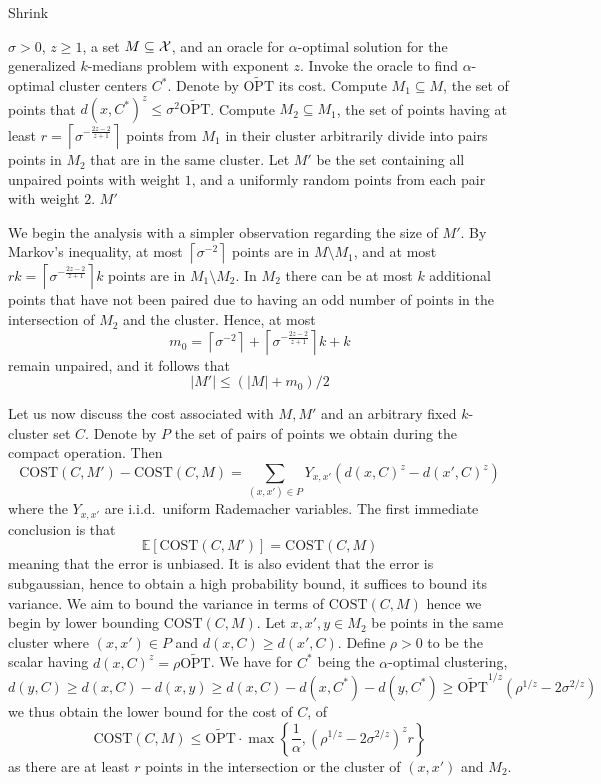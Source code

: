 \documentclass[11pt]{article}
\newcommand{\ceil}[1]{\left \lceil #1 \right \rceil}
\newcommand{\E}{{\mathbb{E}}}
\newcommand{\cost}{\text{COST}}
\newcommand{\topt}{\widetilde{\text{OPT}}}
\begin{document}
\begin{algorithm} 
\begin{algorithmic}
\caption{Shrink} \label{alg:shrink}
 $\sigma >0$, $z \geq 1$, a set $M \subseteq {\cal X}$, and an oracle for $\alpha$-optimal solution for the generalized $k$-medians problem with exponent $z$.
\State Invoke the oracle to find $\alpha$-optimal cluster centers $C^*$. Denote by $\topt$ its cost.
\State Compute $M_1 \subseteq M$, the set of points that $d(x,C^*)^z \leq \sigma^2 \topt$.
\State Compute $M_2 \subseteq M_1$, the set of points having at least $r = \ceil{\sigma^{-\frac{2z-2}{z+1}}}$ points from $M_1$ in their cluster
\State arbitrarily divide into pairs points in $M_2$ that are in the same cluster.
\State Let $M'$ be the set containing all unpaired points with weight $1$, and a uniformly random points from each pair with weight $2$.
 $M'$
\end{algorithmic}
\end{algorithm}

We begin the analysis with a simpler observation regarding the size of $M'$. By Markov's inequality, at most 
$\ceil{\sigma^{-2}}$
points are in  $M \setminus M_1$, and at most $r k = \ceil{\sigma^{-\frac{2z-2}{z+1}}} k$ points are in $M_1 \setminus M_2$. In $M_2$ there can be at most $k$ additional points that have not been paired due to having an odd number of points in the intersection of $M_2$ and the cluster. Hence, at most 
$$m_0 = \ceil{\sigma^{-2}} +  \ceil{\sigma^{-\frac{2z-2}{z+1}}} k + k$$
remain unpaired, and it follows that 
$$ |M'| \leq (|M|+m_0)/2 $$


Let us now discuss the cost associated with $M,M'$ and an arbitrary fixed $k$-cluster set $C$. Denote by $P$ the set of pairs of points we obtain during the compact operation. Then
$$ \cost(C,M') - \cost(C,M) = \sum_{(x,x') \in P} Y_{x,x'} \left( d(x,C)^z - d(x',C)^z \right) $$
where the $Y_{x,x'}$ are i.i.d.\ uniform Rademacher variables. The first immediate conclusion is that
\begin{equation} \label{eq:compact_mean0}
\E[\cost(C,M')] = \cost(C,M)
\end{equation}
meaning that the error is unbiased. It is also evident that the error is subgaussian, hence to obtain a high probability bound, it suffices to bound its variance. We aim to bound the variance in terms of $\cost(C,M)$ hence we begin by lower bounding $\cost(C,M)$. Let $x,x',y \in M_2$ be points in the same cluster where $(x,x') \in P$ and $d(x,C) \geq d(x',C)$. Define $\rho >0$ to be the scalar having $d(x,C)^z = \rho \topt$. We have for $C^*$ being the $\alpha$-optimal clustering,
$$ d(y,C) \geq d(x,C) - d(x,y) \geq d(x,C) - d(x,C^*) - d(y,C^*) \geq \topt^{1/z} (\rho^{1/z} - 2\sigma^{2/z}) $$
we thus obtain the lower bound for the cost of $C$, of
$$ \cost(C,M) \leq \topt \cdot \max \left\{ \frac{1}{\alpha}, (\rho^{1/z} - 2\sigma^{2/z})^z r \right\}$$
as there are at least $r$ points in the intersection or the cluster of $(x,x')$ and $M_2$.
\end{document}
